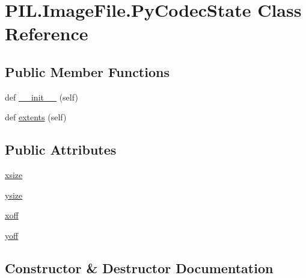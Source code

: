 \hypertarget{classPIL_1_1ImageFile_1_1PyCodecState}{}\section{P\+I\+L.\+Image\+File.\+Py\+Codec\+State Class Reference}
\label{classPIL_1_1ImageFile_1_1PyCodecState}
\subsection*{Public Member Functions}
\begin{DoxyCompactItemize}
\item 
def \hyperlink{classPIL_1_1ImageFile_1_1PyCodecState_a9de404336eb7b6c94678cc400dde4825}{\+\_\+\+\_\+init\+\_\+\+\_\+} (self)
\item 
def \hyperlink{classPIL_1_1ImageFile_1_1PyCodecState_a949fdbebe43dedfcbcc2c7d94a9a8c89}{extents} (self)
\end{DoxyCompactItemize}
\subsection*{Public Attributes}
\begin{DoxyCompactItemize}
\item 
\hyperlink{classPIL_1_1ImageFile_1_1PyCodecState_aa340617a5d2a8972812b5082ec742fb6}{xsize}
\item 
\hyperlink{classPIL_1_1ImageFile_1_1PyCodecState_a1c87e99447c7d4183033420a9827c070}{ysize}
\item 
\hyperlink{classPIL_1_1ImageFile_1_1PyCodecState_af2e7689f4aeef8853958344e067f5a4d}{xoff}
\item 
\hyperlink{classPIL_1_1ImageFile_1_1PyCodecState_acf478f84e09c040617365c3c6d44bd54}{yoff}
\end{DoxyCompactItemize}


\subsection{Constructor \& Destructor Documentation}
\mbox{\label{classPIL_1_1ImageFile_1_1PyCodecState_a9de404336eb7b6c94678cc400dde4825}} 

